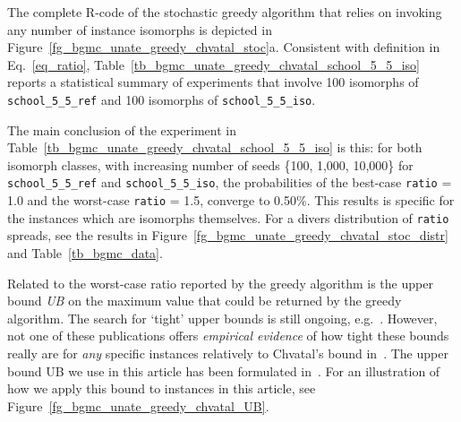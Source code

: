 The complete R-code of the stochastic greedy algorithm 
that relies on invoking any number of instance isomorphs is
depicted in 
Figure~\ref{fg_bgmc_unate_greedy_chvatal_stoc}a.
Consistent with definition in Eq.~\ref{eq_ratio}, 
Table~\ref{tb_bgmc_unate_greedy_chvatal_school_5_5_iso}
reports a statistical summary of experiments that involve
100 isomorphs of {\tt school\_5\_5\_ref} and 
100 isomorphs of {\tt school\_5\_5\_iso}.
%
%

%
\par
The main conclusion of the experiment in 
Table~\ref{tb_bgmc_unate_greedy_chvatal_school_5_5_iso} is this:
for both isomorph classes, with increasing number of seeds
\{100, 1,000, 10,000\} for
{\tt school\_5\_5\_ref} and {\tt school\_5\_5\_iso},
the probabilities of the best-case {\tt ratio} = 1.0 
and the worst-case {\tt ratio} = 1.5,  
converge to 0.50\%. This results is specific for the
instances which are isomorphs themselves. 
For a divers distribution of
{\tt ratio} spreads, see the results in
Figure~\ref{fg_bgmc_unate_greedy_chvatal_stoc_distr}
and
Table~\ref{tb_bgmc_data}.
 
Related to the worst-case ratio reported by the greedy algorithm
is the upper bound {\it UB} on the maximum value that could be
returned by the greedy algorithm. 
The search for  `tight'  upper bounds 
is still ongoing,
e.g.~\cite{
OPUS-setc-2012-LBCS-Saket-UB,
OPUS-setc-2016-OR-Felici-UB,
OPUS-setc-2019-STOC-Abboud-UB}.
%
%
% 
% 
However, not one of these publications offers
{\em empirical evidence} of how tight these bounds really are
for {\em any} specific instances
relatively to Chvatal's bound in~\cite{OPUS-setc-1979-OR-Chvatal-greedy}.
The upper bound UB we use in 
this article has been formulated in~\cite{OPUS-setc-1979-OR-Chvatal-greedy}.
For an illustration of how we apply this bound to instances in this article,
see Figure~\ref{fg_bgmc_unate_greedy_chvatal_UB}.
%
 


